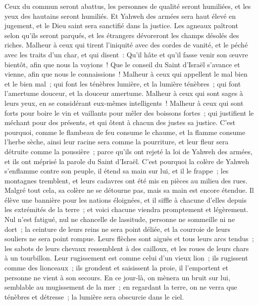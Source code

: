 \begin{multicols}{2}
Ceux du commun seront abattus, les personnes de qualité seront humiliées, et les yeux des hautains seront humiliés.
Et Yahweh des armées sera haut élevé en jugement, et le Dieu saint sera sanctifié dans la justice.
Les agneaux paîtront selon qu'ils seront parqués, et les étrangers dévoreront les champs désolés des riches.
Malheur à ceux qui tirent l'iniquité avec des cordes de vanité, et le péché avec les traits d'un char,
et qui disent~: Qu'il hâte et qu'il fasse venir son œuvre bientôt, afin que nous la voyions~! Que le conseil du Saint d'Israël s'avance et vienne, afin que nous le connaissions~!
Malheur à ceux qui appellent le mal bien et le bien mal~; qui font les ténèbres lumière, et la lumière ténèbres~; qui font l'amertume douceur, et la douceur amertume.
Malheur à ceux qui sont sages à leurs yeux, en se considérant eux-mêmes intelligents~!
Malheur à ceux qui sont forts pour boire le vin et vaillants pour mêler des boissons fortes~;
qui justifient le méchant pour des présents, et qui ôtent à chacun des justes sa justice.
C'est pourquoi, comme le flambeau de feu consume le chaume, et la flamme consume l'herbe sèche, ainsi leur racine sera comme la pourriture, et leur fleur sera détruite comme la poussière~; parce qu'ils ont rejeté la loi de Yahweh des armées, et ils ont méprisé la parole du Saint d'Israël.
C'est pourquoi la colère de Yahweh s'enflamme contre son peuple, il étend sa main sur lui, et il le frappe~; les montagnes tremblent, et leurs cadavres ont été mis en pièces au milieu des rues. Malgré tout cela, sa colère ne se détourne pas, mais sa main est encore étendue.
Il élève une bannière pour les nations éloignées, et il siffle à chacune d'elles depuis les extrémités de la terre~; et voici chacune viendra promptement et légèrement.
Nul n'est fatigué, nul ne chancelle de lassitude, personne ne sommeille ni ne dort~; la ceinture de leurs reins ne sera point déliée, et la courroie de leurs souliers ne sera point rompue.
Leurs flèches sont aiguës et tous leurs arcs tendus~; les sabots de leurs chevaux ressemblent à des cailloux, et les roues de leurs chars à un tourbillon.
Leur rugissement est comme celui d'un vieux lion~; ils rugissent comme des lionceaux~; ils grondent et saisissent la proie, il l'emportent et personne ne vient à son secours.
En ce jour-là, on mènera un bruit sur lui, semblable au mugissement de la mer~; en regardant la terre, on ne verra que ténèbres et détresse~; la lumière sera obscurcie dans le ciel.

\end{multicols}
